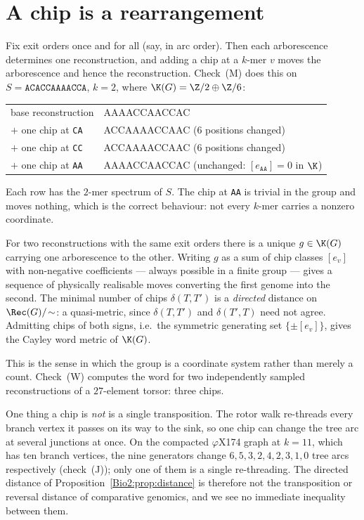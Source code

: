 \section{A chip is a rearrangement}\label{Bio2:sec:moves}

Fix exit orders once and for all (say, in arc order). Then each arborescence determines
one reconstruction, and adding a chip at a $k$-mer $v$ moves the arborescence and hence
the reconstruction. Check~(M) does this on $S=\texttt{ACACCAAAACCA}$, $k=2$, where
$\K(G)=\Z/2\oplus\Z/6$:
\begin{center}\ttfamily\small
\begin{tabular}{ll}
base reconstruction & AAAACCAACCAC\\
$+$ one chip at \texttt{CA} & ACCAAAACCAAC \quad(6 positions changed)\\
$+$ one chip at \texttt{CC} & ACCAAAACCAAC \quad(6 positions changed)\\
$+$ one chip at \texttt{AA} & AAAACCAACCAC \quad(unchanged: $[e_{\texttt{AA}}]=0$ in $\K$)\\
\end{tabular}
\end{center}
Each row has the $2$-mer spectrum of $S$. The chip at \texttt{AA} is trivial in the group
and moves nothing, which is the correct behaviour: not every $k$-mer carries a nonzero
coordinate.

\begin{proposition}[Distance]\label{Bio2:prop:distance}
For two reconstructions with the same exit orders there is a unique $g\in\K(G)$ carrying
one arborescence to the other. Writing $g$ as a sum of chip classes $[e_v]$ with
non-negative coefficients --- always possible in a finite group --- gives a sequence of
physically realisable moves converting the first genome into the second. The minimal
number of chips $\delta(T,T')$ is a \emph{directed} distance on $\Rec(G)/\!\sim$: a
quasi-metric, since $\delta(T,T')$ and $\delta(T',T)$ need not agree. Admitting chips of
both signs, i.e.\ the symmetric generating set $\{\pm[e_v]\}$, gives the Cayley word
metric of $\K(G)$.
\end{proposition}

This is the sense in which the group is a coordinate system rather than merely a count.
Check~(W) computes the word for two independently sampled reconstructions of a
$27$-element torsor: three chips.

One thing a chip is \emph{not} is a single transposition. The rotor walk re-threads every
branch vertex it passes on its way to the sink, so one chip can change the tree arc at
several junctions at once. On the compacted $\varphi$X174 graph at $k=11$, which has ten
branch vertices, the nine generators change $6,5,3,2,4,2,3,1,0$ tree arcs respectively
(check~(J)); only one of them is a single re-threading. The directed distance of
Proposition~\ref{Bio2:prop:distance} is therefore not the transposition or reversal distance
of comparative genomics, and we see no immediate inequality between them.

